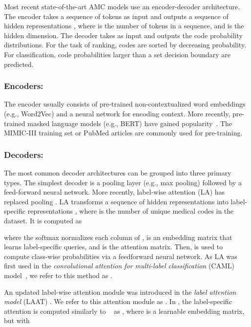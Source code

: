 \documentclass[anonymous=false, sigconf=true, review=false, natbib=true]{acmart}
\begin{document}
Most recent state-of-the-art AMC models use an encoder-decoder architecture. The encoder takes a sequence of tokens  as input and outputs a sequence of hidden representations , where  is the number of tokens in a sequence, and  is the hidden dimension. The decoder takes  as input and outputs the code probability distributions. For the task of ranking, codes are sorted by decreasing probability. For classification, code probabilities larger than a set decision boundary are predicted. 





\subsubsection{Encoders:}
The encoder usually consists of pre-trained non-contextualized word embeddings (e.g., Word2Vec) and a neural network for encoding context. More recently, pre-trained masked language models (e.g., BERT) have gained popularity~\cite{tengReviewDeepNeural2022}. The MIMIC-III training set or PubMed articles are commonly used for pre-training.


\subsubsection{Decoders:}
The most common decoder architectures can be grouped into three primary types. 
The simplest decoder is a pooling layer (e.g., max pooling) followed by a feed-forward neural network. More recently, label-wise attention (LA) \cite{mullenbachExplainablePredictionMedical2018} has replaced pooling \cite{vuLabelAttentionModel2020, liuEffectiveConvolutionalAttention2021, huangPLMICDAutomaticICD2022, liICDCodingClinical2020}. LA transforms a sequence of hidden representations  into label-specific representations , where  is the number of unique medical codes in the dataset.
It is computed as

where the softmax normalizes each column of ,  is an embedding matrix that learns label-specific queries, and  is the attention matrix. 
Then,  is used to compute class-wise probabilities via a feedforward neural network. 
As LA was first used in the \textit{convolutional attention for multi-label classification} (CAML) model~\cite{mullenbachExplainablePredictionMedical2018}, we refer to this method as \lacaml.

An updated label-wise attention module was introduced in the \textit{label attention model} (LAAT) \cite{vuLabelAttentionModel2020}. We refer to this attention module as \lalaat. In \lalaat, the label-specific attention is computed similarly to  \lacaml~ as , where  is a learnable embedding matrix, but with 
 
\end{document}
